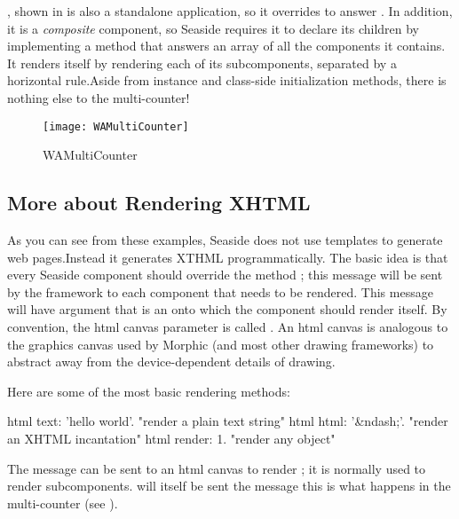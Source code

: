 \documentclass[a4paper,10pt,twoside]{book}
\begin{document}
, shown in  is also a standalone application,
so it overrides  to answer .
In addition, it is a \emph{composite} component, so Seaside requires it to declare its
children by implementing a method  that answers an array of all the
components it contains.
It renders itself by rendering each of its subcomponents, separated by a horizontal
rule.Aside from instance and class-side initialization methods, there is nothing else to
the
multi-counter!

\begin{figure}[bht]
\begin{center}
\texttt{[image: WAMultiCounter]}
\caption{WAMultiCounter}
\end{center}
\end{figure}

\subsection{More about Rendering XHTML}

As you can see from these examples, Seaside does not use templates to generate web
pages.Instead it generates XTHML programmatically.
The basic idea is that every Seaside component should override the method
; this message will be sent by the framework to
each component that needs to be rendered.
This  message will have argument that is an   onto which the component should render itself. By
convention, the html canvas parameter is called .
An html canvas is analogous to the graphics canvas used by Morphic (and most other
drawing frameworks) to abstract away from the device-dependent details of drawing.
 

Here are some of the most basic rendering methods:
\begin{code}{}
html text: 'hello world'.  "render a plain text string"
html html: '&ndash;'.     "render an XHTML incantation"
html render: 1.              "render any object"
\end{code}

The message  can be sent to an html canvas to render
; it is normally used to render subcomponents.  will itself
be sent the message 
this is what happens in the multi-counter (see ).
\end{document}
